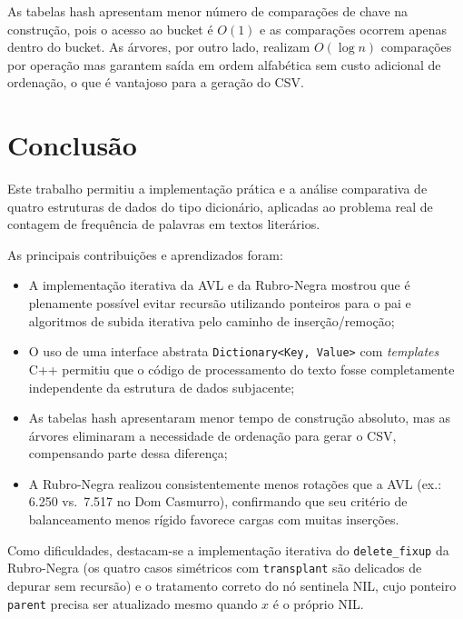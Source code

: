 \documentclass[12pt, a4paper]{article}
\begin{document}
As tabelas hash apresentam menor número de comparações de chave na construção, pois o
acesso ao bucket é $O(1)$ e as comparações ocorrem apenas dentro do bucket. As árvores,
por outro lado, realizam $O(\log n)$ comparações por operação mas garantem saída em
ordem alfabética sem custo adicional de ordenação, o que é vantajoso para a geração
do CSV.

\section{Conclusão}

Este trabalho permitiu a implementação prática e a análise comparativa de quatro
estruturas de dados do tipo dicionário, aplicadas ao problema real de contagem de
frequência de palavras em textos literários.

As principais contribuições e aprendizados foram:

\begin{itemize}
    \item A implementação iterativa da AVL e da Rubro-Negra mostrou que é plenamente
          possível evitar recursão utilizando ponteiros para o pai e algoritmos de
          subida iterativa pelo caminho de inserção/remoção;

    \item O uso de uma interface abstrata \texttt{Dictionary<Key, Value>} com
          \textit{templates} C++ permitiu que o código de processamento do texto
          fosse completamente independente da estrutura de dados subjacente;

    \item As tabelas hash apresentaram menor tempo de construção absoluto, mas as
          árvores eliminaram a necessidade de ordenação para gerar o CSV, compensando
          parte dessa diferença;

    \item A Rubro-Negra realizou consistentemente menos rotações que a AVL
          (ex.: 6.250 vs.\ 7.517 no Dom Casmurro), confirmando que seu critério
          de balanceamento menos rígido favorece cargas com muitas inserções.
\end{itemize}

Como dificuldades, destacam-se a implementação iterativa do \texttt{delete\_fixup} da
Rubro-Negra (os quatro casos simétricos com \texttt{transplant} são delicados de
depurar sem recursão) e o tratamento correto do nó sentinela NIL, cujo ponteiro
\texttt{parent} precisa ser atualizado mesmo quando $x$ é o próprio NIL.
\end{document}
